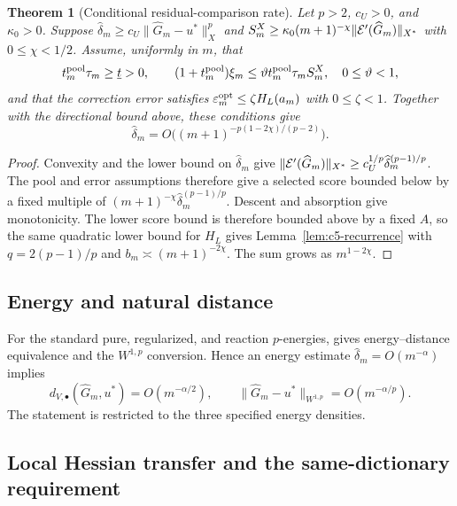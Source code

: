 \documentclass[11pt]{article}
\newtheorem{theorem}{Theorem}[section]
\theoremstyle{remark}\newtheorem{remark}[theorem]{Remark}
\begin{document}
\begin{theorem}[Conditional residual-comparison rate]
\label{thm:c5-visible}
Let $p>2$, $c_U>0$, and $\kappa_0>0$. Suppose
$\widehat\delta_m\ge c_U\|\widehat G_m-u^*\|_X^p$ and
$S_m^X\ge\kappa_0(m+1)^{-\chi}\|\mathcal E'(\widehat G_m)\|_{X^*}$ with
$0\le\chi<1/2$.  Assume, uniformly in $m$, that
\[
 t_m^{\rm pool}\tau_m\ge\underline t>0,\qquad
 (1+t_m^{\rm pool})\xi_m\leq\vartheta t_m^{\rm pool}\tau_m S_m^X,
 \quad 0\leq\vartheta<1,
\]
and that the correction error satisfies
$\varepsilon_m^{\rm opt}\leq\zeta H_L(a_m)$ with $0\leq\zeta<1$.
Together with the directional bound above, these conditions give
\begin{equation}
 \widehat\delta_m=O\big((m+1)^{-p(1-2\chi)/(p-2)}\big).
 \label{eq:c5-visible-rate}
\end{equation}
\end{theorem}
\begin{proof}
Convexity and the lower bound on $\widehat\delta_m$ give
$\|\mathcal E'(\widehat G_m)\|_{X^*}\geq c_U^{1/p}\widehat\delta_m^{(p-1)/p}$.
The pool and error assumptions therefore give a selected score bounded below by
a fixed multiple of $(m+1)^{-\chi}\widehat\delta_m^{(p-1)/p}$.
Descent and absorption give monotonicity. The lower score bound is therefore
bounded above by a fixed $A$, so the same quadratic lower bound for $H_L$
gives Lemma~\ref{lem:c5-recurrence} with $q=2(p-1)/p$ and
$b_m\asymp(m+1)^{-2\chi}$. The sum grows as $m^{1-2\chi}$.
\end{proof}

\subsection{Energy and natural distance}
\label{sec:c5-natural}

For the standard pure, regularized, and reaction $p$-energies, \CGAEnergyMetricReference gives
energy--distance equivalence and the $W^{1,p}$ conversion.  Hence an energy estimate
$\widehat\delta_m=O(m^{-\alpha})$ implies
\[
 d_{V,\bullet}(\widehat G_m,u^*)=O(m^{-\alpha/2}),\qquad
 \|\widehat G_m-u^*\|_{W^{1,p}}=O(m^{-\alpha/p}).
\]
The statement is restricted to the three specified energy densities.

\subsection{Local Hessian transfer and the same-dictionary requirement}
\label{sec:c5-hessian}
\end{document}
